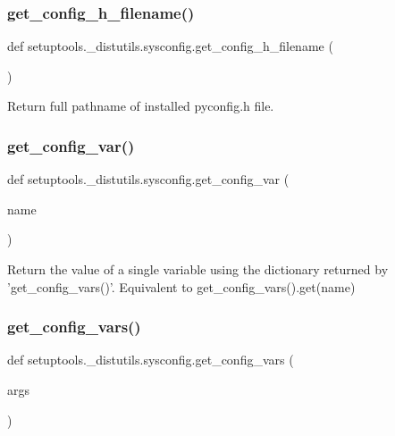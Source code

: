 \subsubsection{\texorpdfstring{get\+\_\+config\+\_\+h\+\_\+filename()}{get\_config\_h\_filename()}}
{\footnotesize\ttfamily def setuptools.\+\_\+distutils.\+sysconfig.\+get\+\_\+config\+\_\+h\+\_\+filename (\begin{DoxyParamCaption}{ }\end{DoxyParamCaption})}

\begin{DoxyVerb}Return full pathname of installed pyconfig.h file.\end{DoxyVerb}
 \mbox{\label{namespacesetuptools_1_1__distutils_1_1sysconfig_af15382b8afd67ab2f138f8d446d0fa4e}} 
\subsubsection{\texorpdfstring{get\+\_\+config\+\_\+var()}{get\_config\_var()}}
{\footnotesize\ttfamily def setuptools.\+\_\+distutils.\+sysconfig.\+get\+\_\+config\+\_\+var (\begin{DoxyParamCaption}\item[{}]{name }\end{DoxyParamCaption})}

\begin{DoxyVerb}Return the value of a single variable using the dictionary
returned by 'get_config_vars()'.  Equivalent to
get_config_vars().get(name)
\end{DoxyVerb}
 \mbox{\label{namespacesetuptools_1_1__distutils_1_1sysconfig_a25304bca2db6df2257bfff276682f515}} 
\subsubsection{\texorpdfstring{get\+\_\+config\+\_\+vars()}{get\_config\_vars()}}
{\footnotesize\ttfamily def setuptools.\+\_\+distutils.\+sysconfig.\+get\+\_\+config\+\_\+vars (\begin{DoxyParamCaption}\item[{}]{args }\end{DoxyParamCaption})}

